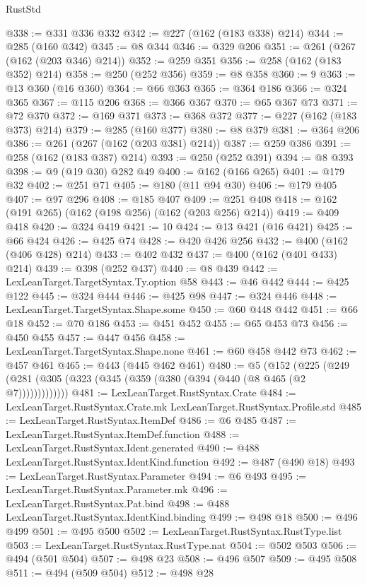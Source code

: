 \begin{lexlean}{RustStd}
\begin{coremodule}
@338 := @331 @336 @332
@342 := @227 (@162 (@183 @338) @214)
@344 := @285 (@160 @342)
@345 := @8 @344
@346 := @329 @206
@351 := @261 (@267 (@162 (@203 @346) @214))
@352 := @259 @351
@356 := @258 (@162 (@183 @352) @214)
@358 := @250 (@252 @356)
@359 := @8 @358
@360 := 9
@363 := @13 @360 (@16 @360)
@364 := @66 @363
@365 := @364 @186
@366 := @324 @365
@367 := @115 @206
@368 := @366 @367
@370 := @65 @367 @73
@371 := @72 @370
@372 := @169 @371
@373 := @368 @372
@377 := @227 (@162 (@183 @373) @214)
@379 := @285 (@160 @377)
@380 := @8 @379
@381 := @364 @206
@386 := @261 (@267 (@162 (@203 @381) @214))
@387 := @259 @386
@391 := @258 (@162 (@183 @387) @214)
@393 := @250 (@252 @391)
@394 := @8 @393
@398 := @9 (@19 @30) @282 @49
@400 := @162 (@166 @265)
@401 := @179 @32
@402 := @251 @71
@405 := @180 (@11 @94 @30)
@406 := @179 @405
@407 := @97 @296
@408 := @185 @407
@409 := @251 @408
@418 := @162 (@191 @265) (@162 (@198 @256) (@162 (@203 @256) @214))
@419 := @409 @418
@420 := @324 @419
@421 := 10
@424 := @13 @421 (@16 @421)
@425 := @66 @424
@426 := @425 @74
@428 := @420 @426 @256
@432 := @400 (@162 (@406 @428) @214)
@433 := @402 @432
@437 := @400 (@162 (@401 @433) @214)
@439 := @398 (@252 @437)
@440 := @8 @439
@442 := LexLeanTarget.TargetSyntax.Ty.option @58
@443 := @46 @442
@444 := @425 @122
@445 := @324 @444
@446 := @425 @98
@447 := @324 @446
@448 := LexLeanTarget.TargetSyntax.Shape.some
@450 := @60 @448 @442
@451 := @66 @18
@452 := @70 @186
@453 := @451 @452
@455 := @65 @453 @73
@456 := @450 @455
@457 := @447 @456
@458 := LexLeanTarget.TargetSyntax.Shape.none
@461 := @60 @458 @442 @73
@462 := @457 @461
@465 := @443 (@445 @462 @461)
@480 := @5
    (@152 (@225 (@249 (@281 (@305 (@323 (@345 (@359 (@380 (@394 (@440 (@8 @465 (@2 @7)))))))))))))
@481 := LexLeanTarget.RustSyntax.Crate
@484 := LexLeanTarget.RustSyntax.Crate.mk LexLeanTarget.RustSyntax.Profile.std
@485 := LexLeanTarget.RustSyntax.ItemDef
@486 := @6 @485
@487 := LexLeanTarget.RustSyntax.ItemDef.function
@488 := LexLeanTarget.RustSyntax.Ident.generated
@490 := @488 LexLeanTarget.RustSyntax.IdentKind.function
@492 := @487 (@490 @18)
@493 := LexLeanTarget.RustSyntax.Parameter
@494 := @6 @493
@495 := LexLeanTarget.RustSyntax.Parameter.mk
@496 := LexLeanTarget.RustSyntax.Pat.bind
@498 := @488 LexLeanTarget.RustSyntax.IdentKind.binding
@499 := @498 @18
@500 := @496 @499
@501 := @495 @500
@502 := LexLeanTarget.RustSyntax.RustType.list
@503 := LexLeanTarget.RustSyntax.RustType.nat
@504 := @502 @503
@506 := @494 (@501 @504)
@507 := @498 @23
@508 := @496 @507
@509 := @495 @508
@511 := @494 (@509 @504)
@512 := @498 @28

\end{coremodule}
\end{lexlean}
